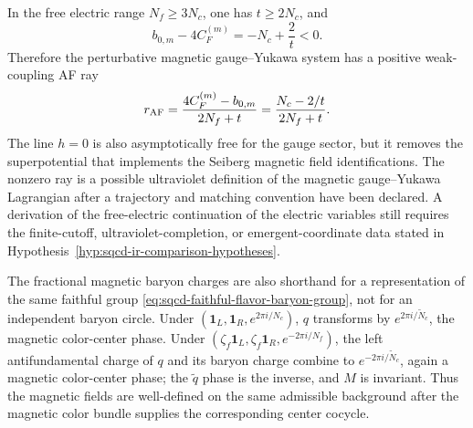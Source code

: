 In the free electric range \(N_f\ge 3N_c\), one has \(t\ge2N_c\), and
\[
  b_{0,m}-4C_F^{(m)}
  =
  -N_c+\frac{2}{t}
  <
  0 .
\]
Therefore the perturbative magnetic gauge--Yukawa system has a positive
weak-coupling AF ray
\[
  r_{\rm AF}
  =
  \frac{4C_F^{(m)}-b_{0,m}}{2N_f+t}
  =
  \frac{N_c-2/t}{2N_f+t}.
\]
The line \(h=0\) is also asymptotically free for the gauge sector, but it
removes the superpotential that implements the Seiberg magnetic field
identifications.  The nonzero ray is a possible ultraviolet definition of the
magnetic gauge--Yukawa Lagrangian after a trajectory and matching convention
have been declared.  A derivation of the free-electric continuation of the
electric variables still requires the finite-cutoff, ultraviolet-completion,
or emergent-coordinate data stated in
Hypothesis~\ref{hyp:sqcd-ir-comparison-hypotheses}.

The fractional magnetic baryon charges are also shorthand for a representation
of the same faithful group \eqref{eq:sqcd-faithful-flavor-baryon-group}, not
for an independent baryon circle.  Under
\((\mathbf 1_L,\mathbf 1_R,e^{2\pi i/N_c})\), \(q\) transforms by
\(e^{2\pi i/\widetilde N_c}\), the magnetic color-center phase.  Under
\((\zeta_f\mathbf 1_L,\zeta_f\mathbf 1_R,e^{-2\pi i/N_f})\), the left
antifundamental charge of \(q\) and its baryon charge combine to
\(e^{-2\pi i/\widetilde N_c}\), again a magnetic color-center phase; the
\(\widetilde q\) phase is the inverse, and \(M\) is invariant.  Thus the
magnetic fields are well-defined on the same admissible background after the
magnetic color bundle supplies the corresponding center cocycle.

